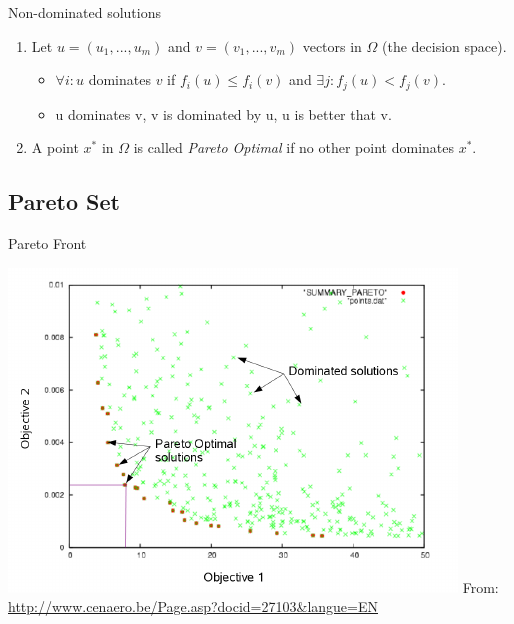 \documentclass[ignorenonframetext,]{beamer}
\providecommand{\tightlist}{%
  \setlength{\itemsep}{0pt}\setlength{\parskip}{0pt}}
\begin{document}
\begin{frame}{Non-dominated solutions}

\begin{enumerate}
\def\labelenumi{\arabic{enumi}.}
\tightlist
\item
  Let \(u = (u_1, ..., u_m)\) and \(v = (v_1, ..., v_m)\) vectors in
  \(\Omega\) (the decision space).

  \begin{itemize}
  \tightlist
  \item
    \(\forall i:u\) dominates \(v\) if \(f_i(u) \leq f_i(v)\) and
    \(\exists j:f_j(u) < f_j(v)\).
  \item
    u dominates v, v is dominated by u, u is better that v.
  \end{itemize}
\item
  A point \(x^*\) in \(\Omega\) is called \emph{Pareto Optimal} if no
  other point dominates \(x^*\). 
\end{enumerate}

\end{frame}

\subsection{Pareto Set}\label{pareto-set-2}

\begin{frame}{Pareto Front}

\centering
\includegraphics{cellular_moead_files/figure-beamer/unnamed-chunk-2-1.pdf}
\tiny From: \url{http://www.cenaero.be/Page.asp?docid=27103\&langue=EN}

\end{frame}
\end{document}
